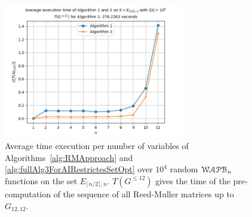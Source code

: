 \documentclass[11pt]{llncs}
\begin{document}
\begin{figure}[ht]
    \centering
    \includegraphics[width=0.7\textwidth]{images/plot_10000.png}
    \caption{Average time execution per number of variables of Algorithms~\ref{alg:RMApproach} and \ref{alg:fullAlg3ForAIRestrictesSetOpt} over $10^4$ random $\mathcal{WAPB}_{n}$ functions on the set $E_{\lceil{n/2}\rceil,n}$. 
    $T\left(G^{\leq 12}\right)$ gives the time of the pre-computation of the sequence of all Reed-Muller matrices up to $G_{12,12}$.}\label{fig:compTimePlot}
\end{figure}
\end{document}
